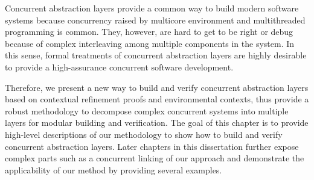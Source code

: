 

Concurrent abstraction layers provide a common way to build modern software systems because concurrency raised by multicore environment and multithreaded programming is common.
They, however, are hard to get to be right or debug because of complex interleaving among multiple components in the system. 
In this sense, formal treatments of concurrent abstraction layers are highly desirable to provide a 
high-assurance concurrent software development. 

Therefore, we present a new way to build and verify concurrent abstraction layers 
based on contextual refinement proofs and environmental contexts,
thus provide a robust methodology to decompose complex concurrent systems into multiple layers for modular building and verification.
The goal of this chapter is to provide high-level descriptions of our methodology to show how to build and verify concurrent abstraction layers.
Later chapters in this dissertation further expose complex parts such as a concurrent linking of our approach
and demonstrate the applicability of our method by providing several examples. 